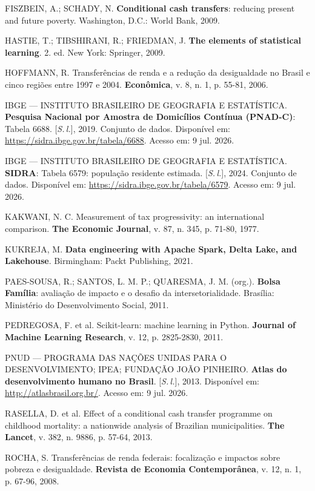 \documentclass[12pt,a4paper,oneside]{article}
\begin{document}
\begin{singlespace}
 FISZBEIN, A.; SCHADY, N. \textbf{Conditional cash transfers}: reducing present and future poverty. Washington, D.C.: World Bank, 2009.

 HASTIE, T.; TIBSHIRANI, R.; FRIEDMAN, J. \textbf{The elements of statistical learning}. 2. ed. New York: Springer, 2009.

 HOFFMANN, R. Transferências de renda e a redução da desigualdade no Brasil e cinco regiões entre 1997 e 2004. \textbf{Econômica}, v. 8, n. 1, p. 55-81, 2006.

 IBGE --- INSTITUTO BRASILEIRO DE GEOGRAFIA E ESTATÍSTICA. \textbf{Pesquisa Nacional por Amostra de Domicílios Contínua (PNAD-C)}: Tabela 6688. [\textit{S.\,l.}], 2019. Conjunto de dados. Disponível em: \url{https://sidra.ibge.gov.br/tabela/6688}. Acesso em: 9 jul. 2026.

 IBGE --- INSTITUTO BRASILEIRO DE GEOGRAFIA E ESTATÍSTICA. \textbf{SIDRA}: Tabela 6579: população residente estimada. [\textit{S.\,l.}], 2024. Conjunto de dados. Disponível em: \url{https://sidra.ibge.gov.br/tabela/6579}. Acesso em: 9 jul. 2026.

 KAKWANI, N. C. Measurement of tax progressivity: an international comparison. \textbf{The Economic Journal}, v. 87, n. 345, p. 71-80, 1977.

 KUKREJA, M. \textbf{Data engineering with Apache Spark, Delta Lake, and Lakehouse}. Birmingham: Packt Publishing, 2021.

 PAES-SOUSA, R.; SANTOS, L. M. P.; QUARESMA, J. M. (org.). \textbf{Bolsa Família}: avaliação de impacto e o desafio da intersetorialidade. Brasília: Ministério do Desenvolvimento Social, 2011.

 PEDREGOSA, F. et al. Scikit-learn: machine learning in Python. \textbf{Journal of Machine Learning Research}, v. 12, p. 2825-2830, 2011.

 PNUD --- PROGRAMA DAS NAÇÕES UNIDAS PARA O DESENVOLVIMENTO; IPEA; FUNDAÇÃO JOÃO PINHEIRO. \textbf{Atlas do desenvolvimento humano no Brasil}. [\textit{S.\,l.}], 2013. Disponível em: \url{http://atlasbrasil.org.br/}. Acesso em: 9 jul. 2026.

 RASELLA, D. et al. Effect of a conditional cash transfer programme on childhood mortality: a nationwide analysis of Brazilian municipalities. \textbf{The Lancet}, v. 382, n. 9886, p. 57-64, 2013.

 ROCHA, S. Transferências de renda federais: focalização e impactos sobre pobreza e desigualdade. \textbf{Revista de Economia Contemporânea}, v. 12, n. 1, p. 67-96, 2008.


\end{singlespace}
\end{document}
